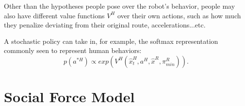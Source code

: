 \documentclass{article}
\begin{document}
Other than the hypotheses people pose over the robot's behavior, people may also have different value functions $V^H$ over their own actions, such as how much they penalize deviating from their original route, accelerations...etc.

A stochastic policy can take in, for example, the softmax representation commonly seen to represent human behaviors:
\begin{equation}
p(a^{*H}) \propto exp( V^H(\hat{x}^H_t, a^H ,\hat{x}^R,\pi^R_{min})).
\end{equation}

\section{Social Force Model}










\end{document}
